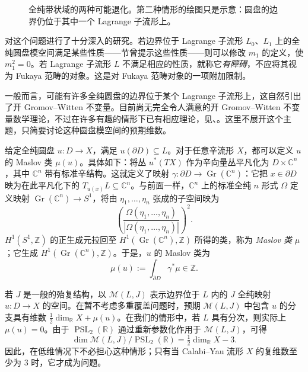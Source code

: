 \begin{figure}[H]
\centering
{}
\caption{全纯带状域的两种可能退化。第二种情形的绘图只是示意：圆盘的边界仍位于其中一个 Lagrange 子流形上。}\label{fig:8.19}
\end{figure}

对这个问题进行了十分深入的研究。若边界位于 Lagrange 子流形 $L_0$、$L_1$ 上的全纯圆盘模空间满足某些性质——节曾提示这些性质——则可以修改 $m_1$ 的定义，使 $m_1^2=0$。若 Lagrange 子流形 $L$ 不满足相应的性质，就称它\emph{有障碍}，不应将其视为 Fukaya 范畴的对象。这是对 Fukaya 范畴对象的一项附加限制。

一般而言，可能有许多全纯圆盘的边界位于某个 Lagrange 子流形上，这自然引出了开 Gromov--Witten 不变量。目前尚无完全令人满意的开 Gromov--Witten 不变量数学理论，不过在许多有趣的情形下已有相应理论，见、。这里不展开这个主题，只简要讨论这种圆盘模空间的预期维数。

给定全纯圆盘 $u\colon D\to X$，满足 $u(\partial D)\subseteq L$。对于任意辛流形 $X$，都可以定义 $u$ 的 Maslov 类 $\mu(u)$。具体如下：将丛 $u^*(TX)$ 作为辛向量丛平凡化为 $D\times\mathbb C^n$，其中 $\mathbb C^n$ 带有标准辛结构。这就定义了映射 $\gamma\colon\partial D\to\operatorname{Gr}(\mathbb C^n)$：它把 $x\in\partial D$ 映为在此平凡化下的 $T_{u(x)}L\subseteq\mathbb C^n$。与前面一样，$\mathbb C^n$ 上的标准全纯 $n$ 形式 $\Omega$ 定义映射 $\operatorname{Gr}(\mathbb C^n)\to S^1$，将由 $\eta_1,\ldots,\eta_n$ 张成的子空间映为
\[
\left(\frac{\Omega(\eta_1,\ldots,\eta_n)}
{|\Omega(\eta_1,\ldots,\eta_n)|}\right)^2.
\]
$H^1(S^1,\mathbb Z)$ 的正生成元拉回至 $H^1(\operatorname{Gr}(\mathbb C^n),\mathbb Z)$ 所得的类，称为 \emph{Maslov 类} $\mu$；它生成 $H^1(\operatorname{Gr}(\mathbb C^n),\mathbb Z)$。于是，$u$ 的 Maslov 类为
\[
\mu(u):=\int_{\partial D}\gamma^*\mu\in\mathbb Z.
\]

若 $J$ 是一般的殆复结构，以 $\mathcal M(L,J)$ 表示边界位于 $L$ 内的 $J$ 全纯映射 $u\colon D\to X$ 的空间。在暂不考虑多重覆盖问题时，预期 $\mathcal M(L,J)$ 中包含 $u$ 的分支具有维数 $\tfrac12\dim_{\mathbb R}X+\mu(u)$。在我们的情形中，若 $L$ 具有分次，则实际上 $\mu(u)=0$。由于 $\operatorname{PSL}_2(\mathbb R)$ 通过重新参数化作用于 $\mathcal M(L,J)$，可得
\[
\dim\mathcal M(L,J)/\operatorname{PSL}_2(\mathbb R)
=\tfrac12\dim_{\mathbb R}X-3.
\]
因此，在低维情况下不必担心这种情形；只有当 Calabi--Yau 流形 $X$ 的复维数至少为 $3$ 时，它才成为问题。

